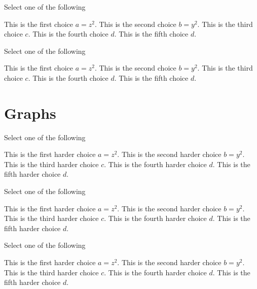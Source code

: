 \begin{problem}[90][Xchoice II]
Select one of the following
\begin{xchoice}
\choice This is the first choice $a = z^2$.
\choice This is the second choice $b = y^2$.
\choice* This is the third choice $c$.
\choice* This is the fourth choice $d$.
\choice This is the fifth choice $d$.
\end{xchoice}
\end{problem}

\begin{problem}
Select one of the following
\begin{xchoice}
\choice This is the first choice $a = z^2$.
\choice This is the second choice $b = y^2$.
\choice* This is the third choice $c$.
\choice* This is the fourth choice $d$.
\choice This is the fifth choice $d$.
\end{xchoice}
\end{problem}

\section[100]{Graphs}

\begin{problem}
Select one of the following
\begin{xchoice}
\choice This is the first harder choice $a = z^2$.
\choice This is the second harder choice $b = y^2$.
\choice* This is the third harder choice $c$.
\choice* This is the fourth harder choice $d$.
\choice This is the fifth harder choice $d$.
\end{xchoice}
\end{problem}


\begin{problem}
Select one of the following
\begin{xchoice}
\choice This is the first harder choice $a = z^2$.
\choice This is the second harder choice $b = y^2$.
\choice* This is the third harder choice $c$.
\choice* This is the fourth harder choice $d$.
\choice This is the fifth harder choice $d$.
\end{xchoice}
\end{problem}

\begin{problem}
Select one of the following
\begin{xchoice}
\choice This is the first harder choice $a = z^2$.
\choice This is the second harder choice $b = y^2$.
\choice* This is the third harder choice $c$.
\choice* This is the fourth harder choice $d$.
\choice This is the fifth harder choice $d$.
\end{xchoice}
\end{problem}



